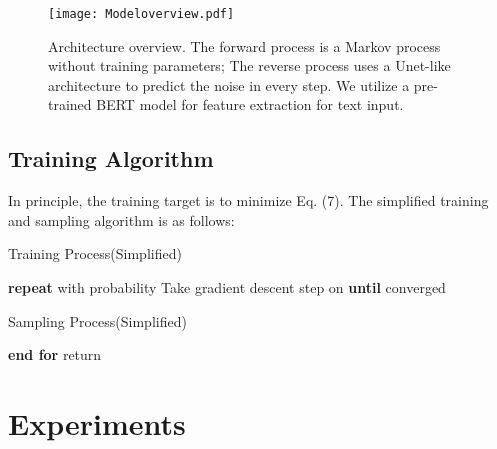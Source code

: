 \documentclass{article}
\begin{document}
\begin{figure}[h]
    \centering
    \texttt{[image: Modeloverview.pdf]}
    \caption{Architecture overview. The forward process is a Markov process without training parameters; The reverse process uses a Unet-like architecture to predict the noise in every step. We utilize a pre-trained BERT model for feature extraction for text input.}
    \label{fig:1}
    \vspace{-5mm}
\end{figure}

\subsection{Training Algorithm}
In principle, the training target is to minimize Eq. (7). The simplified training and sampling algorithm is as follows:
\begin{algorithm}
    \caption{Training Process(Simplified)}
    \begin{algorithmic}
        \STATE \textbf{repeat}
        \STATE \hspace{0.5cm}
        \STATE \hspace{0.5cm} with probability 
        \STATE \hspace{0.5cm}
        \STATE \hspace{0.5cm}
        \STATE \hspace{0.5cm} \STATE \hspace{0.5cm}
        \STATE \hspace{0.5cm}
        \STATE \hspace{0.5cm}Take gradient descent step on
        \STATE \hspace{1cm} 
        \STATE \textbf{until} converged
    \end{algorithmic}
\end{algorithm}
\begin{algorithm}
    \caption{Sampling Process(Simplified)}
    \begin{algorithmic}
        \STATE 
        \STATE 
        \STATE \hspace{0.5cm}
        \STATE \hspace{0.5cm}
        \STATE \textbf{end for }
        \STATE return 
    \end{algorithmic}
\end{algorithm}



\section{Experiments}
\end{document}
